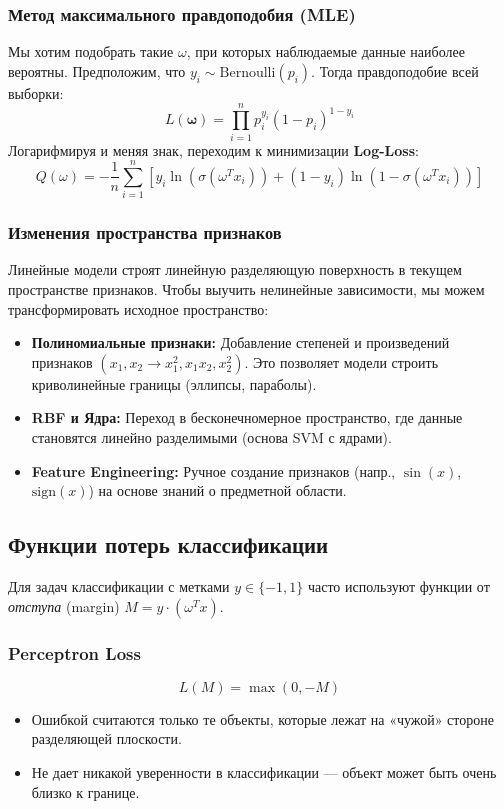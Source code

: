\documentclass[12pt]{article}
\begin{document}
\subsubsection{Метод максимального правдоподобия (MLE)}
Мы хотим подобрать такие $\omega$, при которых наблюдаемые данные наиболее вероятны. Предположим, что $y_i \sim \text{Bernoulli}(p_i)$. Тогда правдоподобие всей выборки:
\[ L(\mathbf{\omega}) = \prod_{i=1}^n p_i^{y_i} (1-p_i)^{1-y_i} \]
Логарифмируя и меняя знак, переходим к минимизации \textbf{Log-Loss}:
\[ Q(\omega) = -\frac{1}{n} \sum_{i=1}^n [y_i \ln(\sigma(\omega^T x_i)) + (1-y_i) \ln(1 - \sigma(\omega^T x_i))] \]

\subsubsection{Изменения пространства признаков}
Линейные модели строят линейную разделяющую поверхность в текущем пространстве признаков. Чтобы выучить нелинейные зависимости, мы можем трансформировать исходное пространство:
\begin{itemize}
    \item \textbf{Полиномиальные признаки:} Добавление степеней и произведений признаков $(x_1, x_2 \to x_1^2, x_1x_2, x_2^2)$. Это позволяет модели строить криволинейные границы (эллипсы, параболы).
    \item \textbf{RBF и Ядра:} Переход в бесконечномерное пространство, где данные становятся линейно разделимыми (основа SVM с ядрами).
    \item \textbf{Feature Engineering:} Ручное создание признаков (напр., $\sin(x)$, $\text{sign}(x)$) на основе знаний о предметной области.
\end{itemize}

\subsection{Функции потерь классификации}
Для задач классификации с метками $y \in \{-1, 1\}$ часто используют функции от \textit{отступа} (margin) $M = y \cdot (\omega^T x)$.

\subsubsection{Perceptron Loss}
\[ L(M) = \max(0, -M) \]
\begin{itemize}
    \item Ошибкой считаются только те объекты, которые лежат на «чужой» стороне разделяющей плоскости.
    \item Не дает никакой уверенности в классификации — объект может быть очень близко к границе.
\end{itemize}
\end{document}
